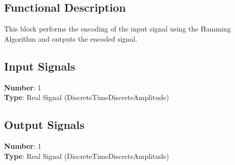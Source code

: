 \subsection*{Functional Description}

This block performs the encoding of the input signal using the Hamming Algorithm and outputs the encoded signal.

\subsection*{Input Signals}

\textbf{Number}: 1\\
\textbf{Type}: Real Signal (DiscreteTimeDiscreteAmplitude)

\subsection*{Output Signals}

\textbf{Number}: 1\\
\textbf{Type}: Real Signal (DiscreteTimeDiscreteAmplitude)

%
